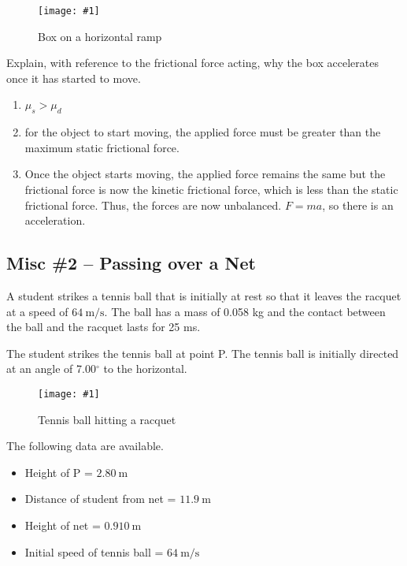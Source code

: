 \documentclass[a4paper,12pt]{article}
\newcommand{\degsym}{^{\circ}}
\newcommand{\img}[4]{\begin{center}
  \begin{figure}[H]
    \centering
    \texttt{[image: \#1]}
    \caption{#3}
    \label{fig:#4}
  \end{figure}
\end{center}}
\begin{document}
\begin{enumerate}[label=(\alph*)]
        \img{ex/3.png}{0.35}{Box on a horizontal ramp}{boxhorizontal}

        Explain, with reference to the frictional force acting, why the box accelerates once
        it has started to move.
        \begin{enumerate}[label=\arabic*.]
          \item $\mu_s > \mu_d$
          \item for the object to start moving, the applied force must be greater than the maximum static frictional force.
          \item Once the object starts moving, the applied force remains the same but the frictional force is now the kinetic frictional force, which is less than the static frictional force. Thus, the forces are now unbalanced. $F = ma$, so there is an acceleration.
        \end{enumerate}
\end{enumerate}

\pagebreak

\subsection{Misc \#2 -- Passing over a Net}

A student strikes a tennis ball that is initially at rest so that it leaves the racquet at a
speed of $\SI{64}{\m\per\s}$. The ball has a mass of 0.058 kg and the contact between the ball and the racquet lasts for 25 ms.

The student strikes the tennis ball at point P. The tennis ball is initially directed at an angle of 7.00$\degsym$ to the horizontal.

\img{ex/4.png}{0.8}{Tennis ball hitting a racquet}{tennisball}

The following data are available.
\begin{itemize}
  \item Height of P = $\SI{2.80}{\m}$
  \item Distance of student from net = $\SI{11.9}{\m}$
  \item Height of net = $\SI{0.910}{\m}$
  \item Initial speed of tennis ball = $\SI{64}{\m\per\s}$
\end{itemize}
\end{document}
